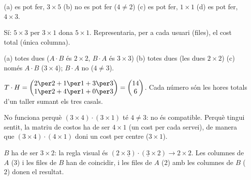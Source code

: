 \begin{solucions}
\begin{sollist}
  \item (a) es pot fer, $3\times 5$ \quad (b) no es pot fer ($4\neq 2$) \quad
        (c) es pot fer, $1\times 1$ \quad (d) es pot fer, $4\times 3$.
  \item Sí: $5\times 3$ per $3\times 1$ dona $5\times 1$. Representaria, per a cada
        usuari (files), el cost total (única columna).
  \item (a) totes dues ($A\cdot B$ és $2\times 2$, $B\cdot A$ és $3\times 3$) \quad
        (b) totes dues (les dues $2\times 2$) \quad (c) només $A\cdot B$ ($3\times 4$);
        $B\cdot A$ no ($4\neq 3$).
  \item $T\cdot H=\begin{pmatrix} 2\per 2+1\per 1+3\per 3 \\ 1\per 2+4\per 1+0\per 3 \end{pmatrix}
        =\begin{pmatrix} 14 \\ 6 \end{pmatrix}$. Cada número són les hores totals
        d'un taller sumant els tres casals.
  \item No funciona perquè $(3\times 4)\cdot(3\times 1)$ té $4\neq 3$: no és
        compatible. Perquè tingui sentit, la matriu de costos ha de ser
        $4\times 1$ (un cost per cada servei), de manera que
        $(3\times 4)\cdot(4\times 1)$ doni un cost per centre ($3\times 1$).
  \item $B$ ha de ser $3\times 2$: la regla visual és
        $(2\times \underline{3})\cdot(\underline{3}\times 2)\rightarrow 2\times 2$.
        Les columnes de $A$ ($3$) i les files de $B$ han de coincidir, i les files
        de $A$ ($2$) amb les columnes de $B$ ($2$) donen el resultat.
\end{sollist}
\end{solucions}
